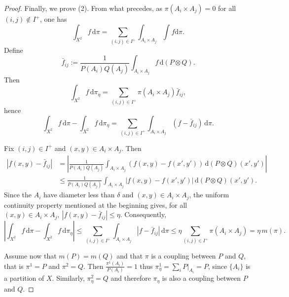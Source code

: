 \documentclass[10pt,a4paper]{amsart}
\begin{document}
\begin{proof}
Finally, we prove (2). From what precedes, as $\pi(A_i\times A_j)=0$ for all $(i,j)\notin I^+$, one has
\[
\int_{X^2} f\, \mathrm{d}\pi = \sum_{(i,j)\in I^+}
\int_{A_i\times A_j} \int f \mathrm{d}\pi.
\]
Define
\[
\bar f_{ij}
:=
\frac1{P(A_i)Q(A_j)}
\int_{A_i\times A_j}
f\, \mathrm{d}(P\otimes Q).
\]
Then
\[
\int_{X^2} f\, \mathrm{d}\pi_\eta
=
\sum_{(i,j)\in I^+}
\pi(A_i\times A_j)\bar f_{ij},
\]
hence
\[
\int_{X^2} f\, \mathrm{d}\pi
-
\int_{X^2} f\, \mathrm{d}\pi_\eta
=
\sum_{(i,j)\in I^+}
\int_{A_i\times A_j}
(f-\bar f_{ij})\, \mathrm{d}\pi.
\]

Fix \((i,j)\in I^+\) and \((x,y)\in A_i\times A_j\). Then
\[
\begin{aligned}
|f(x,y)-\bar f_{ij}|
&=
\left|
\frac1{P(A_i)Q(A_j)}
\int_{A_i\times A_j}
(f(x,y)-f(x',y'))
\,\mathrm{d}(P\otimes Q)(x',y')
\right| \\
&\le
\frac1{P(A_i)Q(A_j)}
\int_{A_i\times A_j}
|f(x,y)-f(x',y')|
\,\mathrm{d}(P\otimes Q)(x',y').
\end{aligned}
\]
Since the $A_i$ have diameter less than $\delta$ and $(x,y) \in A_i \times A_j$, the uniform continuity property mentioned at the beginning gives, for all $(x,y) \in A_i \times A_j, ~
|f(x,y)-\bar f_{ij}|
\le \eta.
$
Consequently,
\[
\left|
\int_{X^2} f\, \mathrm{d}\pi
-
\int_{X^2} f\, \mathrm{d}\pi_\eta
\right|
\le
\sum_{(i,j)\in I^+}
\int_{A_i\times A_j}
|f-\bar f_{ij}|\, \mathrm{d}\pi 
\le
\eta
\sum_{(i,j)\in I^+}
\pi(A_i\times A_j) 
=
\eta\, m(\pi).
\]

Assume now that \(m(P)=m(Q)\) and that \(\pi\) is a coupling between \(P\) and \(Q\), that is $\pi^1 = P$ and $\pi^2 = Q$. Then $\frac{\pi^1(A_i)}{P(A_i)}=1$
thus $\pi_\eta^1
=
\sum_i P|_{A_i}
=
P$,
since \(\{A_i\}\) is a partition of \(X\). Similarly, $
\pi_\eta^2=Q$ and therefore \(\pi_\eta\) is also a coupling between \(P\) and \(Q\).
\end{proof}
\end{document}
